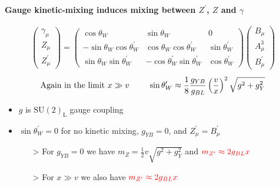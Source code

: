 \documentclass[10pt,xcolor=dvipsnames,mathserif]{beamer}
\renewcommand{\(}{\left(}
\renewcommand{\)}{\right)}
\renewcommand{\[}{\left[}
\renewcommand{\]}{\right]}
\newcommand{\SU}[2]{\mathrm{SU}(#1)_{\mathrm{#2}}}		%
\newcommand{\red}[0]{\color{red}}
\begin{document}
\begin{frame}
	\begin{exampleblock}{}
		{\bf Gauge kinetic-mixing induces mixing between $Z^\prime$, $Z$ and $\gamma$ }
	\end{exampleblock} 
	
	\begin{equation*}
	\begin{aligned}
	\begin{pmatrix}
	\gamma_\mu \\
	Z_\mu \\
	Z^\prime_\mu
	\end{pmatrix}
	=
	\begin{pmatrix}
	\cos \theta_W & \sin \theta_W & 0\\
	-\sin \theta_W \cos \theta_W^\prime & \cos \theta_W \cos \theta_W^\prime & \sin \theta_W^\prime \\
	\sin \theta_W \sin \theta_W^\prime & -\cos \theta_W^\prime \sin \theta_W^\prime & \cos \theta_W^\prime
	\end{pmatrix}
	\begin{pmatrix}
	B_\mu \\
	A^3_\mu \\
	B^\prime_\mu
	\end{pmatrix}
	\end{aligned}
	\end{equation*}	
	$$ \text{Again in the limit $x \gg v$ \qquad } \sin \theta_W^\prime \approx \dfrac{1}{8
		} \dfrac{g_{YB}}{g_{BL}}\(\dfrac{v}{x}\)^2 \sqrt{g^2 + g_Y^2}$$
	\begin{itemize}
		\item $g$ is $\SU{2}{L}$ gauge coupling
		\vskip2mm
		\item $\sin \theta_W^\prime = 0$ for no kinetic mixing, $g_{YB} = 0$, and {\red $Z_\mu^\prime = B_\mu^\prime$}
		\begin{itemize}
			\item[>] For $g_{YB} = 0$ we have $m_Z = \tfrac{1}{2} v \sqrt{g^2 + g_Y^2}$ and ${\red m_{Z^\prime} \approx 2 g_{BL} x}$
			\item[>] For $x \gg v$ we also have ${\red m_{Z^\prime} \approx 2 g_{BL} x}$
		\end{itemize}
	\end{itemize}
	
\end{frame}
\end{document}
